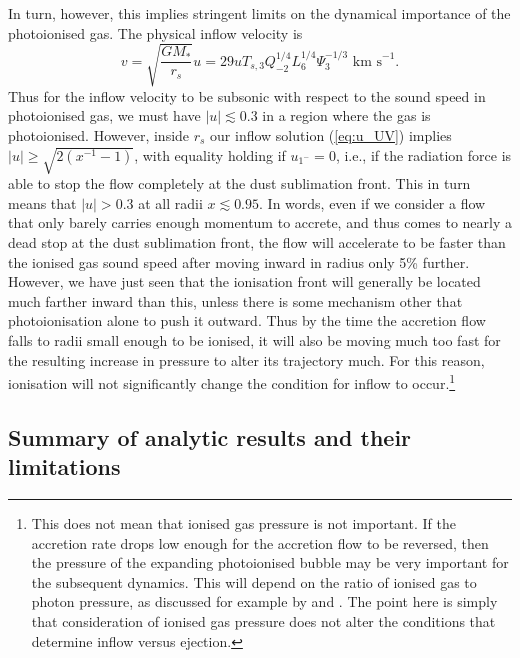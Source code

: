 \documentclass[useAMS,usenatbib]{mn2e}
\begin{document}
In turn, however, this implies stringent limits on the dynamical importance of the photoionised gas. The physical inflow velocity is
\begin{equation}
v = \sqrt{\frac{GM_*}{r_s}} u = 29 u T_{s,3} Q_{-2}^{1/4} L_6^{1/4} \Psi_3^{-1/3} \mbox{ km s}^{-1}.
\end{equation}
Thus for the inflow velocity to be subsonic with respect to the sound speed in photoionised gas, we must have $|u| \lesssim 0.3$ in a region where the gas is photoionised. However, inside $r_s$ our inflow solution (\autoref{eq:u_UV}) implies $|u| \geq \sqrt{2(x^{-1}-1)}$, with equality holding if $u_{1^-} = 0$, i.e., if the radiation force is able to stop the flow completely at the dust sublimation front. This in turn means that $|u| > 0.3$ at all radii $x \lesssim 0.95$. In words, even if we consider a flow that only barely carries enough momentum to accrete, and thus comes to nearly a dead stop at the dust sublimation front, the flow will accelerate to be faster than the ionised gas sound speed after moving inward in radius only 5\% further. However, we have just seen that the ionisation front will generally be located much farther inward than this, unless there is some mechanism other that photoionisation alone to push it outward. Thus by the time the accretion flow falls to radii small enough to be ionised, it will also be moving much too fast for the resulting increase in pressure to alter its trajectory much. For this reason, ionisation will not significantly change the condition for inflow to occur.\footnote{This does not mean that ionised gas pressure is not important. If the accretion rate drops low enough for the accretion flow to be reversed, then the pressure of the expanding photoionised bubble may be very important for the subsequent dynamics. This will depend on the ratio of ionised gas to photon pressure, as discussed for example by \citet{krumholz09d} and \citet{draine11b}. The point here is simply that consideration of ionised gas pressure does not alter the conditions that determine inflow versus ejection.}


\subsection{Summary of analytic results and their limitations}
\label{ssec:analytic_summary}
\end{document}
